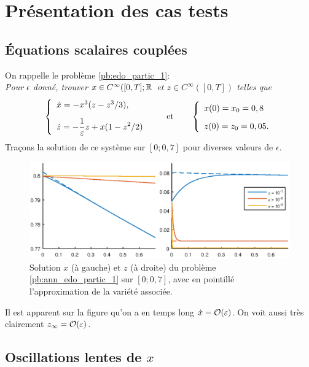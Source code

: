 \chapter{Présentation des cas tests}
\label{sec:ann_exemples}

\section{Équations scalaires couplées}

On rappelle le problème \eqref{pb:edo_partic_1}: \\
{\itshape{}Pour $\epsilon$ donné, trouver $x\in C^{\infty}([0,T]; \mathbb{R}$ et $z \in C^{\infty}([0,T])$ telles que} 
\begin{equation} \label{pb:ann_edo_partic_1}
\left\{ \begin{array}{l}
\dot{x} = -x^3(z-z^3/3) \vphantom{\displaystyle\sum_0} , \\ \displaystyle
\dot{z} = -\frac{1}{\varepsilon} z + x(1-z^2/2) 
\end{array} \right. 
\qquad \text{et} \qquad 
\left\{ \begin{array}{l}
x(0) = x_0 = 0,8 \vphantom{\displaystyle\sum_0} \\
z(0) = z_0 = 0,05 .
\end{array} \right.
\end{equation}
Traçons la solution de ce système sur $[0; 0,7]$ pour diverses valeurs de $\epsilon$. 
\begin{figure}[!h]
\centering
\includegraphics[width=.9\textwidth]{img/ann/solution_cas1.eps}
\caption{Solution $x$ (à gauche) et $z$ (à droite) du problème \eqref{pb:ann_edo_partic_1} sur $[0; 0,7]$, avec en pointillé l'approximation de la variété associée.}
\end{figure}

Il est apparent sur la figure qu'on a en temps long $\dot{x} = \mathcal{O}(\varepsilon)$. 
On voit aussi très clairement $z_{\infty} = \mathcal{O}(\varepsilon)$. 



\section{Oscillations lentes de $x$}

